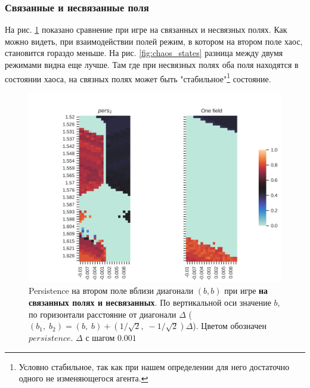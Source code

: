 \documentclass[12pt]{article}
\begin{document}
\subsubsection{Связанные и несвязанные поля}
    На рис. \ref{fig:chaos_compare} показано сравнение при игре на связанных и несвязных полях. Как можно видеть, при взаимодействии полей режим, в котором на втором поле хаос, становится гораздо меньше.
    На рис. \ref{fig:chaos_states} разница между двумя режимами видна еще лучше. Там где при несвязных полях оба поля находятся в состоянии хаоса, на связных полях может быть "стабильное"\footnote{Условно стабильное, так как при нашем определении для него достаточно одного не изменяющегося агента.} состояние.
    \begin{figure}[H]
         \centering
         \includegraphics[width=0.95\columnwidth, keepaspectratio=True]{DoubleField/double_field_comparison_pers.jpg}
         \caption{Persistence на втором поле вблизи диагонали $(b, b)$ при игре \textbf{на связанных полях и несвязанных}. По вертикальной оси значение $b$, по горизонтали расстояние от диагонали $\Delta$ ($(b_1,\;b_2) = (b,\;b) + (1/\sqrt{2},\;-1/\sqrt{2})\Delta$). Цветом обозначен $persistence$. $\Delta$ с шагом $0.001$}
         \label{fig:chaos_compare}
    \end{figure}
    
\end{document}
